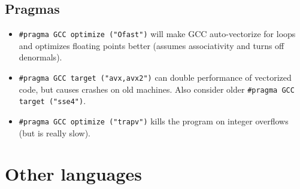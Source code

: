 	\subsection{Pragmas}
	
		\begin{itemize}
			\item \lstinline{#pragma GCC optimize ("Ofast")} will make GCC auto-vectorize for loops and optimizes floating points better (assumes associativity and turns off denormals).
			\item \lstinline{#pragma GCC target ("avx,avx2")} can double performance of vectorized code, but causes crashes on old machines. Also consider older \lstinline{#pragma GCC target ("sse4")}.
			\item \lstinline{#pragma GCC optimize ("trapv")} kills the program on integer overflows (but is really slow).
		\end{itemize}


\section{Other languages}
